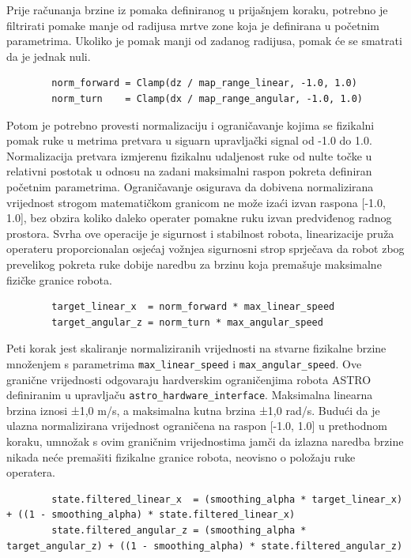\documentclass[12pt,a4paper,oneside]{report}
\begin{document}
Prije računanja brzine iz pomaka definiranog u prijašnjem koraku, potrebno je filtrirati pomake manje od 
radijusa mrtve zone koja je definirana u početnim parametrima. Ukoliko je pomak manji od zadanog radijusa, 
pomak će se smatrati da je jednak nuli.

\begin{verbatim}
        norm_forward = Clamp(dz / map_range_linear, -1.0, 1.0)
        norm_turn    = Clamp(dx / map_range_angular, -1.0, 1.0)
\end{verbatim}

Potom je potrebno provesti normalizaciju i ograničavanje kojima se fizikalni pomak ruke u metrima pretvara 
u siguarn upravljački signal od -1.0 do 1.0. Normalizacija pretvara izmjerenu fizikalnu udaljenost ruke od nulte 
točke u relativni postotak u odnosu na zadani maksimalni raspon pokreta definiran početnim parametrima. 
Ograničavanje osigurava da dobivena normalizirana vrijednost strogom matematičkom granicom ne može izaći izvan 
raspona [-1.0, 1.0], bez obzira koliko daleko operater pomakne ruku izvan predviđenog radnog prostora. 
Svrha ove operacije je sigurnost i stabilnost robota, linearizacije pruža operateru proporcionalan 
osjećaj vožnjea sigurnosni strop sprječava da robot zbog prevelikog pokreta ruke dobije naredbu za brzinu 
koja premašuje maksimalne fizičke granice robota.

\begin{verbatim}
        target_linear_x  = norm_forward * max_linear_speed
        target_angular_z = norm_turn * max_angular_speed
\end{verbatim}

Peti korak jest skaliranje normaliziranih vrijednosti na stvarne fizikalne brzine množenjem s parametrima 
\texttt{max\_linear\_speed} i \texttt{max\_angular\_speed}. Ove granične vrijednosti odgovaraju hardverskim 
ograničenjima robota ASTRO definiranim u upravljaču \texttt{astro\_hardware\_interface}. Maksimalna linearna 
brzina iznosi ±1,0 m/s, a maksimalna kutna brzina ±1,0 rad/s. Budući da je ulazna normalizirana vrijednost 
ograničena na raspon [-1.0, 1.0] u prethodnom koraku, umnožak s ovim graničnim vrijednostima jamči da 
izlazna naredba brzine nikada neće premašiti fizikalne granice robota, neovisno o položaju ruke operatera.

\begin{verbatim}
        state.filtered_linear_x  = (smoothing_alpha * target_linear_x) + ((1 - smoothing_alpha) * state.filtered_linear_x)
        state.filtered_angular_z = (smoothing_alpha * target_angular_z) + ((1 - smoothing_alpha) * state.filtered_angular_z)
\end{verbatim}
\end{document}
